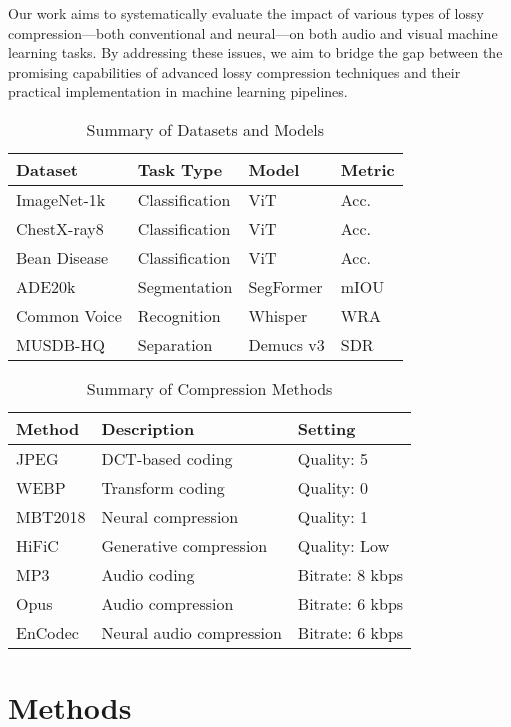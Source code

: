 \documentclass[10pt,twocolumn,letterpaper]{article}
\begin{document}
Our work aims to systematically evaluate the impact of various types of lossy compression---both conventional and neural---on both audio and visual machine learning tasks. By addressing these issues, we aim to bridge the gap between the promising capabilities of advanced lossy compression techniques and their practical implementation in machine learning pipelines.

\begin{table}[ht]
\centering
\caption{Summary of Datasets and Models}
\label{tab:datasets_models}
\begin{tabular}{llll}
\toprule
Dataset & Task Type & Model & Metric \\
\midrule
ImageNet-1k & Classification & ViT &  Acc. \\
ChestX-ray8 & Classification & ViT & Acc. \\
Bean Disease & Classification & ViT & Acc. \\
ADE20k & Segmentation & SegFormer & mIOU \\
Common Voice & Recognition & Whisper & WRA \\
MUSDB-HQ & Separation & Demucs v3 & SDR \\
\bottomrule
\end{tabular}
\end{table}

\begin{table}[ht]
\centering
\caption{Summary of Compression Methods}
\label{tab:compression_methods}
\begin{tabular}{lll}
\toprule
Method & Description & Setting \\
\midrule
JPEG & DCT-based coding & Quality: 5 \\
WEBP & Transform coding & Quality: 0 \\
MBT2018 & Neural compression & Quality: 1 \\
HiFiC & Generative compression & Quality: Low \\
MP3 & Audio coding & Bitrate: 8 kbps \\
Opus & Audio compression & Bitrate: 6 kbps \\
EnCodec & Neural audio compression & Bitrate: 6 kbps \\
\bottomrule
\end{tabular}
\end{table}


\section{Methods}
\end{document}
